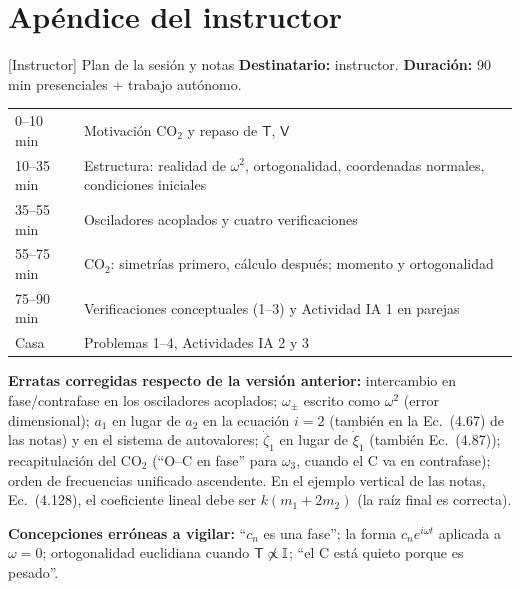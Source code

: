 \documentclass[spanish,10pt]{beamer}
\newif\ifinstructor
\newcommand{\Tm}{\mathsf{T}}                 %
\newcommand{\Vm}{\mathsf{V}}                 %
\begin{document}
\ifinstructor
\appendix
\section*{Apéndice del instructor}

\begin{frame}{[Instructor] Plan de la sesión y notas}
\footnotesize
\textbf{Destinatario:} instructor. \textbf{Duración:} 90 min presenciales + trabajo autónomo.
\begin{tabularx}{\textwidth}{@{}l X@{}}
\toprule
0–10 min & Motivación CO$_2$ y repaso de $\Tm$, $\Vm$ \\
10–35 min & Estructura: realidad de $\omega^2$, ortogonalidad, coordenadas normales, condiciones iniciales \\
35–55 min & Osciladores acoplados y cuatro verificaciones \\
55–75 min & CO$_2$: simetrías primero, cálculo después; momento y ortogonalidad \\
75–90 min & Verificaciones conceptuales (1–3) y Actividad IA 1 en parejas \\
Casa & Problemas 1–4, Actividades IA 2 y 3 \\
\bottomrule
\end{tabularx}
\vspace{0.5ex}
\textbf{Erratas corregidas respecto de la versión anterior:} intercambio en fase/contrafase en los osciladores acoplados; $\omega_\pm$ escrito como $\omega^2$ (error dimensional); $a_1$ en lugar de $a_2$ en la ecuación $i=2$ (también en la Ec.~(4.67) de las notas) y en el sistema de autovalores; $\dot\zeta_1$ en lugar de $\dot\xi_1$ (también Ec.~(4.87)); recapitulación del CO$_2$ (“O–C en fase” para $\omega_3$, cuando el C va en contrafase); orden de frecuencias unificado ascendente. En el ejemplo vertical de las notas, Ec.~(4.128), el coeficiente lineal debe ser $k(m_1+2m_2)$ (la raíz final es correcta).

\textbf{Concepciones erróneas a vigilar:} “$c_n$ es una fase”; la forma $c_ne^{i\omega t}$ aplicada a $\omega=0$; ortogonalidad euclidiana cuando $\Tm\not\propto\Id$; “el C está quieto porque es pesado”.
\end{frame}
\end{document}
